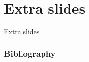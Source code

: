 \nocite{*}
\section{Extra slides}

\begin{frame}
\begin{block}{Extra slides}

\end{block}
\end{frame}


\begin{frame}
\frametitle{Bibliography}
\tiny


\end{frame}


